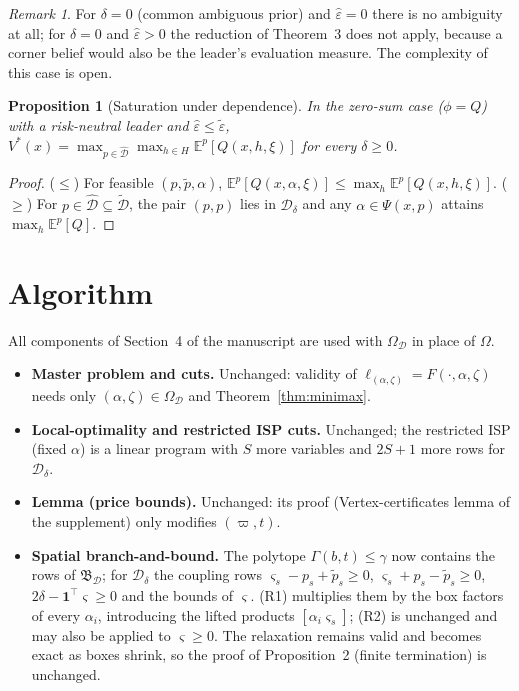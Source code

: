 \documentclass[11pt]{article}
\newtheorem{proposition}{Proposition}
\theoremstyle{definition}
\theoremstyle{remark}
\newtheorem{remark}{Remark}
\newcommand{\D}{\mathcal{D}}
\newcommand{\Dh}{\hat{\mathcal{D}}}
\newcommand{\Dt}{\tilde{\mathcal{D}}}
\newcommand{\tp}{\tilde{p}}
\newcommand{\heps}{\hat{\varepsilon}}
\newcommand{\teps}{\tilde{\varepsilon}}
\newcommand{\B}{\mathfrak{B}}
\begin{document}
\begin{remark}
For $\delta=0$ (common ambiguous prior) and $\heps=0$ there is no ambiguity at all; for $\delta=0$ and $\heps>0$ the reduction of Theorem~3 does not apply, because a corner belief would also be the leader's evaluation measure. The complexity of this case is open.
\end{remark}

\begin{proposition}[Saturation under dependence]\label{prop:sat}
In the zero-sum case ($\phi=Q$) with a risk-neutral leader and $\heps\le\teps$, $V^*(x)=\max_{p\in\Dh}\max_{h\in H}\mathbb E^p[Q(x,h,\xi)]$ for every $\delta\ge0$.
\end{proposition}
\begin{proof}
($\le$) For feasible $(p,\tp,\alpha)$, $\mathbb E^p[Q(x,\alpha,\xi)]\le\max_h\mathbb E^p[Q(x,h,\xi)]$. ($\ge$) For $p\in\Dh\subseteq\Dt$, the pair $(p,p)$ lies in $\D_\delta$ and any $\alpha\in\Psi(x,p)$ attains $\max_h\mathbb E^p[Q]$.
\end{proof}

\section{Algorithm}\label{sec:alg}

All components of Section~4 of the manuscript are used with $\Omega_\D$ in place of $\Omega$.

\begin{itemize}[nosep]
\item \textbf{Master problem and cuts.} Unchanged: validity of $\ell_{(\alpha,\zeta)}=F(\cdot,\alpha,\zeta)$ needs only $(\alpha,\zeta)\in\Omega_\D$ and Theorem~\ref{thm:minimax}.
\item \textbf{Local-optimality and restricted ISP cuts.} Unchanged; the restricted ISP (fixed $\alpha$) is a linear program with $S$ more variables and $2S+1$ more rows for $\D_\delta$.
\item \textbf{Lemma (price bounds).} Unchanged: its proof (Vertex-certificates lemma of the supplement) only modifies $(\varpi,t)$.
\item \textbf{Spatial branch-and-bound.} The polytope $\Gamma(b,t)\le\gamma$ now contains the rows of $\B_\D$; for $\D_\delta$ the coupling rows $\varsigma_s-p_s+\tp_s\ge0$, $\varsigma_s+p_s-\tp_s\ge0$, $2\delta-\mathbf1^\top\varsigma\ge0$ and the bounds of $\varsigma$. (R1) multiplies them by the box factors of every $\alpha_i$, introducing the lifted products $[\alpha_i\varsigma_s]$; (R2) is unchanged and may also be applied to $\varsigma\ge0$. The relaxation remains valid and becomes exact as boxes shrink, so the proof of Proposition~2 (finite termination) is unchanged.
\end{itemize}
\end{document}

